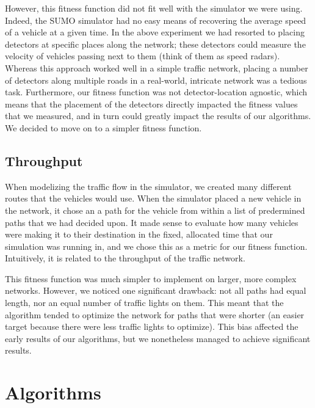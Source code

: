 \documentclass{article} %
\begin{document}
However, this fitness function did not fit well with the simulator we were using. Indeed, the SUMO simulator had no easy means of recovering the average speed of a vehicle at a given time. In the above experiment we had resorted to placing detectors at specific places along the network; these detectors could measure the velocity of vehicles passing next to them (think of them as speed radars). Whereas this approach worked well in a simple traffic network, placing a number of detectors along multiple roads in a real-world, intricate network was a tedious task. Furthermore, our fitness function was not detector-location agnostic, which means that the placement of the detectors directly impacted the fitness values that we measured, and in turn could greatly impact the results of our algorithms. We decided to move on to a simpler fitness function.


\subsection{Throughput}
When modelizing the traffic flow in the simulator, we created many different routes that the vehicles would use. When the simulator placed a new vehicle in the network, it chose an a path for the vehicle from within a list of predermined paths that we had decided upon. It made sense to evaluate how many vehicles were making it to their destination in the fixed, allocated time that our simulation was running in, and we chose this as a metric for our fitness function. Intuitively, it is related to the throughput of the traffic network.

This fitness function was much simpler to implement on larger, more complex networks. However, we noticed one significant drawback: not all paths had equal length, nor an equal number of traffic lights on them. This meant that the algorithm tended to optimize the network for paths that were shorter (an easier target because there were less traffic lights to optimize). This bias affected the early results of our algorithms, but we nonetheless managed to achieve significant results.

\section{Algorithms}
\end{document}
